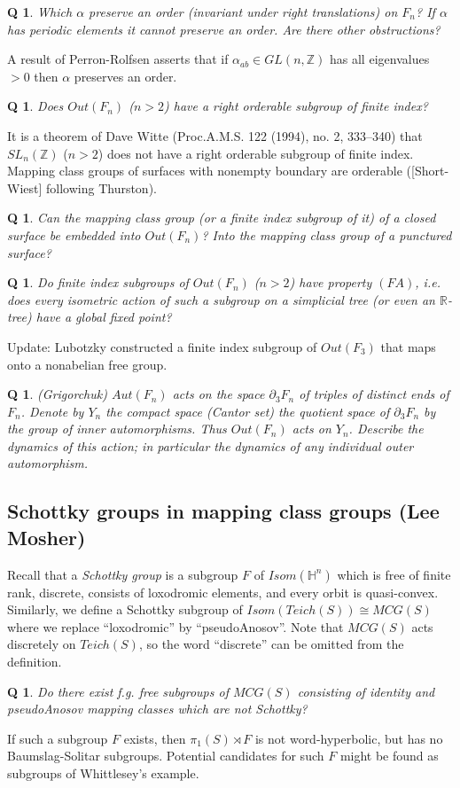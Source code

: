 \documentclass[11pt]{article}
\newtheorem{q}[thm]{Q}
\theoremstyle{remark}
\def\b{\begin{q}}
\def\e{\end{q}}
\def\R{{\mathbb R}}
\def\Z{{\mathbb Z}}
\def\H{{\mathbb H}}
\newcommand{\<}{\langle}
\renewcommand{\>}{\rangle}
\begin{document}
\b
Which $\alpha$ preserve an order (invariant under right translations) on
$F_n$? If $\alpha$ has periodic elements it cannot preserve an order. Are
there other obstructions? \e
A result of Perron-Rolfsen asserts that if
$\alpha_{ab}\in GL(n,\Z)$ has all eigenvalues $>0$ then $\alpha$ preserves an
order. 

\b
Does $Out(F_n)$ ($n>2$) have a right orderable subgroup of finite index?\e
It is a theorem of Dave Witte (Proc.A.M.S. 122 (1994), no. 2, 333--340) that
$SL_n(\Z)$ ($n>2$) does not have a right orderable subgroup of finite
index. Mapping class groups of surfaces with nonempty boundary are orderable
([Short-Wiest] following Thurston). 

\b Can the mapping class group (or a finite index subgroup of it) of a closed
surface be embedded into $Out(F_n)$? Into the mapping class group of a
punctured surface?  \e


\b Do finite index subgroups of $Out(F_n)$ ($n>2$) have property $(FA)$, i.e.
does every isometric action of such a subgroup on a simplicial tree (or even
an $\R$-tree) have a global fixed point?\e

Update: Lubotzky constructed a finite index subgroup of $Out(F_3)$
that maps onto a nonabelian free group.


\b
(Grigorchuk)
$Aut(F_n)$ acts on the space $\partial_3 F_n$ of triples of distinct
ends of $F_n$. Denote by $Y_n$ the compact space (Cantor set) the
quotient space of $\partial_3F_n$ by the group of inner
automorphisms. Thus $Out(F_n)$ acts on $Y_n$. Describe the dynamics of
this action; in particular the dynamics of any individual outer
automorphism. 
\e

\subsection{Schottky groups in mapping class groups (Lee Mosher)}
Recall that a {\it Schottky group} is a subgroup $F$ of $Isom(\H^n)$ which is
free of finite rank, discrete, consists of loxodromic elements, and  every
orbit is quasi-convex.  Similarly, we define a Schottky subgroup of
$Isom(Teich(S))\cong MCG(S)$ where we replace ``loxodromic'' by
``pseudoAnosov''. Note that $MCG(S)$ acts discretely on $Teich(S)$, so the
word ``discrete'' can be omitted from the definition.

\b
Do there exist f.g. free subgroups of $MCG(S)$ consisting of identity and
   pseudoAnosov mapping classes which are not Schottky?\e

If such a subgroup $F$ exists, then $\pi_1(S)\rtimes F$ is not
word-hyperbolic, but has no Baumslag-Solitar subgroups. Potential candidates
for such $F$ might be found as subgroups of Whittlesey's example.
\end{document}
